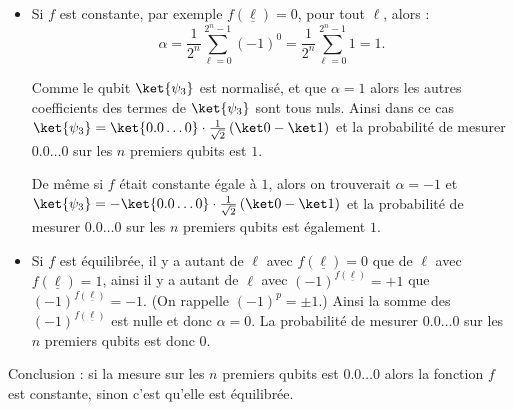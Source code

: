 \documentclass[11pt,class=report,crop=false]{standalone}
\begin{document}
\begin{itemize}
  \item Si $f$ est constante, par exemple $f(\underline\ell)=0$, pour tout $\ell$, alors :
$$\alpha =  \frac{1}{2^{n}}\sum_{\ell=0}^{2^n-1} (-1)^0 = \frac{1}{2^{n}}\sum_{\ell=0}^{2^n-1} 1 = 1.$$

Comme le qubit $\ket{\psi_3}$ est normalisé, et que $\alpha=1$ alors les autres coefficients des termes de $\ket{\psi_3}$ sont tous nuls. Ainsi dans ce cas $\ket{\psi_3} = \ket{0.0\ldots0} \cdot \tfrac{1}{\sqrt{2}}\left(\ket0 - \ket1\right)$ et la probabilité de mesurer $0.0\ldots0$ sur les $n$ premiers qubits est $1$.

De même si $f$ était constante égale à $1$, alors on trouverait $\alpha=-1$ et $\ket{\psi_3} = -\ket{0.0\ldots0} \cdot \tfrac{1}{\sqrt{2}}\left(\ket0 - \ket1\right)$ et la probabilité de mesurer $0.0\ldots0$ sur les $n$ premiers qubits est également $1$.

  \item Si $f$ est équilibrée, il y a autant de $\ell$ avec $f(\underline\ell)=0$ que  de $\ell$ avec $f(\underline\ell)=1$, ainsi il y a autant de $\ell$ avec $(-1)^{f(\underline\ell)} = +1$ que $(-1)^{f(\underline\ell)} = -1$. (On rappelle $(-1)^p=\pm1$.) Ainsi la somme des $(-1)^{f(\underline\ell)}$ est nulle et donc $\alpha = 0$.
  La probabilité de mesurer $0.0\ldots0$ sur les $n$ premiers qubits est donc $0$.
\end{itemize}

Conclusion : si la mesure sur les $n$ premiers qubits est $0.0\ldots0$ alors la fonction $f$ est constante, sinon c'est qu'elle est équilibrée.
\end{document}
